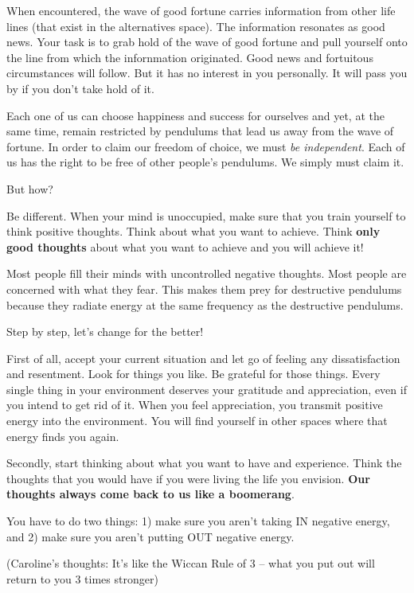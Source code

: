 \documentclass[
  openany]{book}
\begin{document}
When encountered, the wave of good fortune carries information from other life lines (that exist in the alternatives space). The information resonates as good news. Your task is to grab hold of the wave of good fortune and pull yourself onto the line from which the infornmation originated. Good news and fortuitous circumstances will follow. But it has no interest in you personally. It will pass you by if you don't take hold of it.

Each one of us can choose happiness and success for ourselves and yet, at the same time, remain restricted by pendulums that lead us away from the wave of fortune. In order to claim our freedom of choice, we must \emph{be independent}. Each of us has the right to be free of other people's pendulums. We simply must claim it.

But how?

Be different. When your mind is unoccupied, make sure that you train yourself to think positive thoughts. Think about what you want to achieve. Think \textbf{only good thoughts} about what you want to achieve and you will achieve it!

Most people fill their minds with uncontrolled negative thoughts. Most people are concerned with what they fear. This makes them prey for destructive pendulums because they radiate energy at the same frequency as the destructive pendulums.

Step by step, let's change for the better!

First of all, accept your current situation and let go of feeling any dissatisfaction and resentment. Look for things you like. Be grateful for those things. Every single thing in your environment deserves your gratitude and appreciation, even if you intend to get rid of it. When you feel appreciation, you transmit positive energy into the environment. You will find yourself in other spaces where that energy finds you again.

Secondly, start thinking about what you want to have and experience. Think the thoughts that you would have if you were living the life you envision. \textbf{Our thoughts always come back to us like a boomerang}.

You have to do two things:
1) make sure you aren't taking IN negative energy, and
2) make sure you aren't putting OUT negative energy.

(Caroline's thoughts: It's like the Wiccan Rule of 3 -- what you put out will return to you 3 times stronger)
\end{document}
